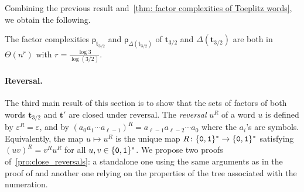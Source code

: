 \documentclass[12pt,reqno]{article}
\newcommand{\cA}{\{{\tt 0},{\tt 1}\}}
\begin{document}
Combining the previous result and~\cref{thm: factor complexities of Toeplitz words},  we obtain the following.

\begin{corollary}
The factor complexities $\mathsf{p}_{\mathbf{t}_{3/2}}$ and $\mathsf{p}_{\Delta(\mathbf{t}_{3/2})}$ of $\mathbf{t}_{3/2}$ and $\Delta(\mathbf{t}_{3/2})$ are both in $\Theta(n^r)$ with $r = \frac{\log 3}{\log (3/2)}$.
\end{corollary}


\paragraph{Reversal.} The third main result of this section is to show that the sets of factors of both words $\mathbf{t}_{3/2}$ and $\mathbf{t}'$ are closed under reversal.
The {\em reversal} $u^R$ of a word $u$ is defined by $\varepsilon^R = \varepsilon$, and by $(a_0 a_1 \cdots a_{\ell-1})^R = a_{\ell-1} a_{\ell-2} \cdots a_0$ where the $a_i$'s are symbols. 
Equivalently, the map $u \mapsto u^R$ is the unique map $R \colon \cA^* \to \cA^*$ satisfying $(uv)^R = v^R u^R$ for all $u,v \in \cA^*$.
We propose two proofs of~\cref{pro:close_reversals}: a standalone one using the same arguments as in the proof of and another one relying on the properties of the tree associated with the numeration. 
\end{document}
